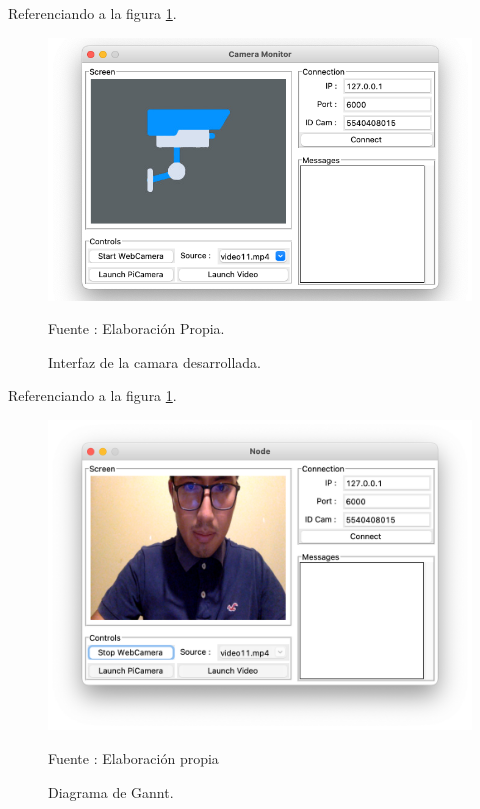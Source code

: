 Referenciando a la figura \ref{fig:camera_screen}.
\begin{figure}[H]
    \begin{center}
        \includegraphics[width=13cm]{img/capitulo_4/camera_screen.png}
        \caption{Interfaz de la camara desarrollada.}
        Fuente : Elaboración Propia.
        \label{fig:camera_screen}
    \end{center}
\end{figure}

Referenciando a la figura \ref{fig:camera_screen}.
\begin{figure}[H]
    \begin{center}
        \includegraphics[width=13cm]{img/capitulo_4/webcamera.png}
        \caption{Diagrama de Gannt.}
        Fuente : Elaboración propia
        \label{fig:webcamera}
    \end{center}
\end{figure}

